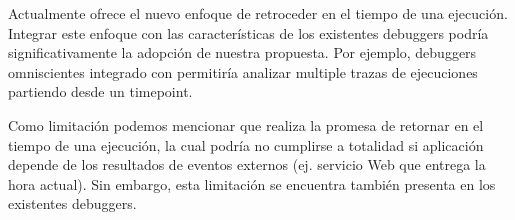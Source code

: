 \documentclass[conference]{IEEEtran}
\begin{document}
\smallskip

 Actualmente \deloreanjs ofrece el nuevo enfoque de retroceder en el tiempo de una ejecuci\'on. Integrar este enfoque con las caracter\'isticas de los existentes debuggers podr\'ia significativamente la adopci\'on de nuestra propuesta. Por ejemplo, debuggers omniscientes integrado con \deloreanjs permitir\'ia analizar multiple trazas de ejecuciones partiendo desde un timepoint.

\smallskip

Como limitaci\'on podemos mencionar que \deloreanjs realiza la promesa de retornar en el tiempo de una ejecuci\'on, la cual podr\'ia no cumplirse a totalidad si aplicaci\'on depende de los resultados de eventos externos (ej. servicio Web que entrega la hora actual). Sin embargo, esta limitaci\'on se encuentra tambi\'en presenta en los existentes debuggers.               



\end{document}
